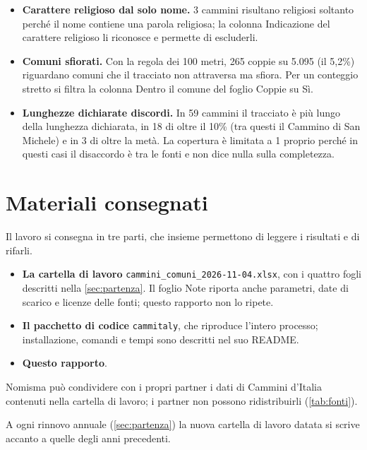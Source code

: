 \begin{itemize}
\item \textbf{Carattere religioso dal solo nome.} 3 cammini risultano religiosi soltanto perché il nome contiene una parola religiosa; la colonna Indicazione del carattere religioso li riconosce e permette di escluderli.
\item \textbf{Comuni sfiorati.} Con la regola dei 100 metri, 265 coppie su 5.095 (il 5,2\%) riguardano comuni che il tracciato non attraversa ma sfiora. Per un conteggio stretto si filtra la colonna Dentro il comune del foglio Coppie su Sì.
\item \textbf{Lunghezze dichiarate discordi.} In 59 cammini il tracciato è più lungo della lunghezza dichiarata, in 18 di oltre il 10\% (tra questi il Cammino di San Michele) e in 3 di oltre la metà. La copertura è limitata a 1 proprio perché in questi casi il disaccordo è tra le fonti e non dice nulla sulla completezza.
\end{itemize}

\FloatBarrier

\section{Materiali consegnati}\label{sec:materiali}

Il lavoro si consegna in tre parti, che insieme permettono di leggere i risultati e di rifarli.

\begin{itemize}
\item \textbf{La cartella di lavoro} \texttt{cammini\_comuni\_2026-11-04.xlsx}, con i quattro fogli descritti nella \cref{sec:partenza}. Il foglio Note riporta anche parametri, date di scarico e licenze delle fonti; questo rapporto non lo ripete.
\item \textbf{Il pacchetto di codice} \texttt{cammitaly}, che riproduce l'intero processo; installazione, comandi e tempi sono descritti nel suo README.
\item \textbf{Questo rapporto}.
\end{itemize}

Nomisma può condividere con i propri partner i dati di Cammini d'Italia contenuti nella cartella di lavoro; i partner non possono ridistribuirli (\cref{tab:fonti}).

A ogni rinnovo annuale (\cref{sec:partenza}) la nuova cartella di lavoro datata si scrive accanto a quelle degli anni precedenti.

\FloatBarrier

\appendix

